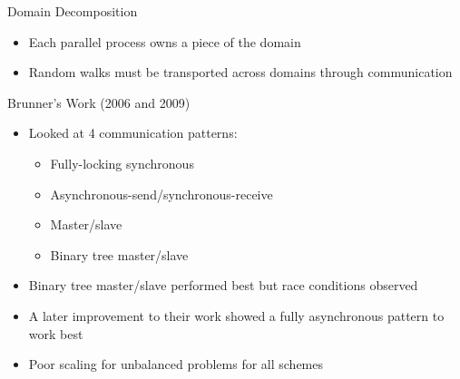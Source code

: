 \documentclass{beamer}
\begin{document}
\begin{frame}{Domain Decomposition}

  \begin{itemize}
  \item Each parallel process owns a piece of the domain
  \item Random walks must be transported across domains through
    communication
  \end{itemize}

  \medskip \medskip
  \begin{beamerboxesrounded}[upper=boxheadcolor,lower=boxbodycolor,shadow=true]
    {Brunner's Work (2006 and 2009)}

    \begin{itemize}
    \item Looked at 4 communication patterns:
      \begin{itemize}
      \item Fully-locking synchronous
      \item Asynchronous-send/synchronous-receive
      \item Master/slave
      \item Binary tree master/slave
      \end{itemize}
    \item Binary tree master/slave performed best but race conditions observed
    \item A later improvement to their work showed a fully asynchronous
      pattern to work best
    \item Poor scaling for unbalanced problems for all schemes
    \end{itemize}
    
  \end{beamerboxesrounded}

\end{frame}
\end{document}
